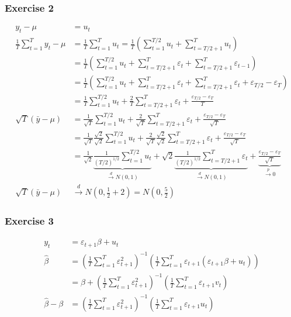 {{\subsubsection*{Exercise 2}
$$
\begin{aligned}
y_{t}-\mu &= u_{t} \\
\frac{1}{T} \sum_{t=1}^{T} y_{t}-\mu &= \frac{1}{T} \sum_{t=1}^{T} u_{t}=\frac{1}{T}\left(\sum_{t=1}^{T / 2} u_{t}+\sum_{t=T / 2+1}^{T} u_{t}\right) \\
& =\frac{1}{T}\left(\sum_{t=1}^{T / 2} u_{t}+\sum_{t=T / 2+1}^{T} \varepsilon_{t}+\sum_{t=T / 2+1}^{T} \varepsilon_{t-1}\right) \\
& =\frac{1}{T}\left(\sum_{t=1}^{T / 2} u_{t}+\sum_{t=T / 2+1}^{T} \varepsilon_{t}+\sum_{t=T / 2+1}^{T} \varepsilon_{t}+\varepsilon_{T / 2}-\varepsilon_{T}\right) \\
& =\frac{1}{T} \sum_{t=1}^{T / 2} u_{t}+\frac{2}{T} \sum_{t=T / 2 +1}^{T} \varepsilon_{t}+\frac{\varepsilon_{T / 2}-\varepsilon_{T}}{T} \\
\sqrt{T}(\bar{y}-\mu) &= \frac{1}{\sqrt{T}} \sum_{t=1}^{T / 2} u_{t}+\frac{2}{\sqrt{T}} \sum_{t=T / 2+1}^{T} \varepsilon_{t}+\frac{\varepsilon_{T / 2}-\varepsilon_{T}}{\sqrt{T}} \\
& =\frac{1}{\sqrt{T}} \frac{\sqrt{2}}{\sqrt{2}} \sum_{t=1}^{T / 2} u_{t}+\frac{2}{\sqrt{T}} \frac{\sqrt{2}}{\sqrt{2}} \sum_{t=T / 2+1}^{T} \varepsilon_{t}+\frac{\varepsilon_{T / 2}-\varepsilon_{T}}{\sqrt{T}} \\
& =\frac{1}{\sqrt{2}} \underbrace{\frac{1}{(T / 2)^{1 / 2}} \sum_{t=1}^{T / 2} u_t}_{\xrightarrow{d} N(0,1)} + \sqrt{2} \underbrace{\frac{1}{(T / 2)^{1 / 2}} \sum_{t=T / 2+1}^T \varepsilon_t}_{\xrightarrow{d} N(0,1)}+\underbrace{\frac{\varepsilon_{T / 2}-\varepsilon_T}{\sqrt{T}}}_{\xrightarrow{p}0} \\
\sqrt{T}(\bar{y}-\mu) & \xrightarrow{d} N(0,\frac{1}{2}+2) = N(0,\frac{5}{2})
\end{aligned}
$$
}
{
\subsubsection*{Exercise 3}

\begin{enumerate}[label=(\alph*)]
{\item 

\begin{align*}
y_{t} & =\varepsilon_{t+1} \beta+u_{t} \\
\hat{\beta} & =\left(\frac{1}{T} \sum_{t=1}^{T} \varepsilon_{t+1}^{2}\right)^{-1}\left(\frac{1}{T} \sum_{t=1}^{T} \varepsilon_{t+1}\left(\varepsilon_{t+1} \beta+u_{t}\right)\right) \\
& =\beta+\left(\frac{1}{T} \sum_{t=1}^{T} \varepsilon_{t+1}^{2}\right)^{-1}\left(\frac{1}{T} \sum_{t=1}^{T} \varepsilon_{t+1} v_{t}\right) \\
\hat{\beta}-\beta & =\left(\frac{1}{T} \sum_{t=1}^{T} \varepsilon_{t+1}^{2}\right)^{-1}\left(\frac{1}{T} \sum_{t=1}^{T} \varepsilon_{t+1} u_{t}\right) \tag{1}
\end{align*}


}
\end{enumerate}}}
